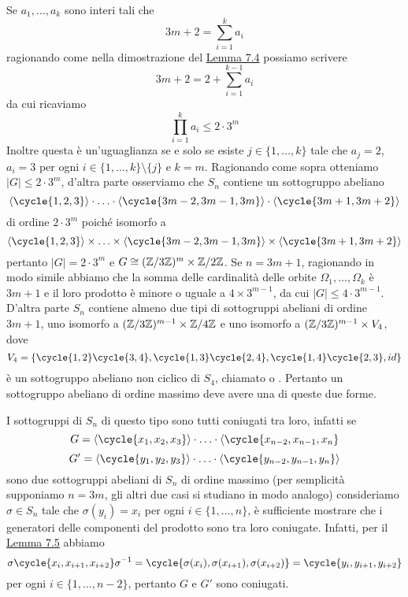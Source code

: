 \documentclass[11pt]{scrartcl}
\begin{document}
\begin{remark}
    Se $a_1, \ldots, a_k$ sono interi tali che 
    \[
        3m + 2 = \sum_{i = 1}^k a_i
    \]
    ragionando come nella dimostrazione del \hyperref[lemma4.0]{Lemma 7.4}
    possiamo scrivere
    \[
        3m + 2 = 2 + \sum_{i = 1}^{k - 1}a_i
    \]
    da cui ricaviamo
    \[
        \prod_{i = 1}^k a_i \leqslant 2\cdot3^m
    \]
    Inoltre questa è un'uguaglianza se e solo se esiste $j \in \{1, \ldots, k\}$
    tale che $a_j = 2$, $a_i = 3$ per ogni $i \in \{1, \ldots, k\}\setminus\{j\}$
    e $k = m$. Ragionando come sopra otteniamo $|G| \leqslant 2\cdot 3^m$, 
    d'altra parte osserviamo che $S_n$ contiene un sottogruppo abeliano
    \[
        \langle\cycle{1, 2, 3}\rangle\cdot\ldots\cdot\langle\cycle{3m - 2, 3m - 1, 3m}\rangle\cdot\langle\cycle{3m + 1, 3m + 2}\rangle
    \]
    di ordine $2\cdot3^m$ poiché isomorfo a 
    \[
        \langle\cycle{1, 2, 3}\rangle\times\ldots\times\langle\cycle{3m - 2, 3m - 1, 3m}\rangle\times\langle\cycle{3m + 1, 3m + 2}\rangle
    \]
    pertanto $|G| = 2\cdot3^m$ e $G \cong (\mathbb{Z}/{3}\mathbb{Z})^m \times \mathbb{Z}/{2}\mathbb{Z}$.
    Se $n = 3m + 1$, ragionando in modo simile abbiamo che la somma delle
    cardinalità delle orbite $\Omega_1, \ldots, \Omega_k$ è $3m + 1$ e il 
    loro prodotto è minore o uguale a $4\times 3^{m - 1}$, da cui $|G| \leq
    4\cdot3^{m - 1}$. D'altra parte $S_n$ contiene almeno due tipi di 
    sottogruppi abeliani di ordine $3m + 1$, uno isomorfo a 
    $(\mathbb{Z}/{3}\mathbb{Z})^{m - 1} \times \mathbb{Z}/{4}\mathbb{Z}$ e uno isomorfo a $(\mathbb{Z}/{3}\mathbb{Z})^{m - 1}\times V_4$,
    dove 
    \[
        V_4 = \{\cycle{1, 2}\cycle{3, 4}, \cycle{1, 3}\cycle{2, 4}, 
    \cycle{1, 4}\cycle{2, 3}, id\}
    \]
    è un sottogruppo abeliano non ciclico di $S_4$, chiamato 
     o . Pertanto un sottogruppo
    abeliano di ordine massimo deve avere una di queste due forme.
\end{remark}

\begin{remark}
    I sottogruppi di $S_n$ di questo tipo sono tutti coniugati tra loro, infatti
    se 
    \[
        G = \langle\cycle{x_1, x_2, x_3}\rangle\cdot\ldots\cdot\langle\cycle{x_{n - 2}, x_{n - 1}, x_n}
    \]
    \[
        G' = \langle\cycle{y_1, y_2, y_3}\rangle\cdot\ldots\cdot\langle\cycle{y_{n - 2}, y_{n - 1}, y_n}\rangle
    \]
    sono due sottogruppi abeliani di $S_n$ di ordine massimo (per semplicità
    supponiamo $n = 3m$, gli altri due casi si studiano in modo analogo)
    consideriamo $\sigma \in S_n$ tale che $\sigma(y_i) = x_i$ per ogni 
    $i \in \{1, \ldots, n\}$, è sufficiente mostrare che i generatori delle componenti del
    prodotto sono tra loro coniugate. Infatti, per il \hyperref[lemma5.0]{Lemma 7.5}
    abbiamo 
    \[
        \sigma\cycle{x_i, x_{i + 1}, x_{i + 2}}\sigma^{-1} = 
        \cycle{\sigma(x_i), \sigma(x_{i + 1}), \sigma(x_{i + 2})} = 
        \cycle{y_i, y_{i + 1}, y_{i + 2}}
    \]
    per ogni $i \in \{1, \ldots, n - 2\}$, pertanto $G$ e $G'$ sono coniugati.
\end{remark}
\end{document}
